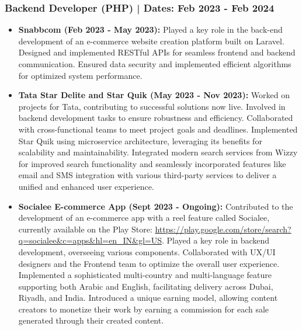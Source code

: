 \documentclass[10pt,a4paper]{article}
\begin{document}
\begin{paracol}{2}
\begin{rightcolumn}
\subsubsection*{Backend Developer (PHP) | Dates: Feb 2023 - Feb 2024}
\textcolor{textgrey}{
\begin{itemize}
    \item \textbf{Snabbcom (Feb 2023 - May 2023):} Played a key role in the back-end development of an e-commerce website creation platform built on Laravel. Designed and implemented RESTful APIs for seamless frontend and backend communication. Ensured data security and implemented efficient algorithms for optimized system performance.
    \item \textbf{Tata Star Delite and Star Quik (May 2023 - Nov 2023):} Worked on projects for Tata, contributing to successful solutions now live. Involved in backend development tasks to ensure robustness and efficiency. Collaborated with cross-functional teams to meet project goals and deadlines. Implemented Star Quik using microservice architecture, leveraging its benefits for scalability and maintainability. Integrated modern search services from Wizzy for improved search functionality and seamlessly incorporated features like email and SMS integration with various third-party services to deliver a unified and enhanced user experience.
    \item \textbf{Socialee E-commerce App (Sept 2023 - Ongoing):} Contributed to the development of an e-commerce app with a reel feature called Socialee, currently available on the Play Store: \url{https://play.google.com/store/search?q=socialee&c=apps&hl=en_IN&gl=US}. Played a key role in backend development, overseeing various components. Collaborated with UX/UI designers and the Frontend team to optimize the overall user experience. Implemented a sophisticated multi-country and multi-language feature supporting both Arabic and English, facilitating delivery across Dubai, Riyadh, and India. Introduced a unique earning model, allowing content creators to monetize their work by earning a commission for each sale generated through their created content.
\end{itemize}
}


\end{rightcolumn}
\end{paracol}
\end{document}
